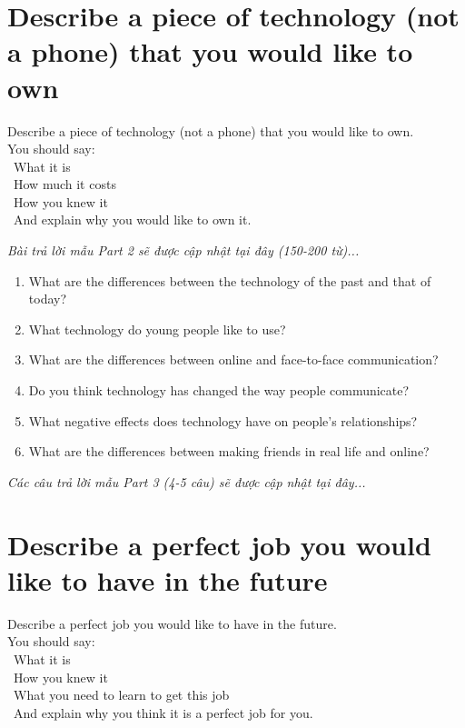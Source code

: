 \section{Describe a piece of technology (not a phone) that you would like to own}
\begin{ieltsprompt}
Describe a piece of technology (not a phone) that you would like to own. \\
You should say: \\
\textbullet\ What it is \\
\textbullet\ How much it costs \\
\textbullet\ How you knew it \\
\textbullet\ And explain why you would like to own it. \\
\end{ieltsprompt}

\vspace{1em}
\textit{Bài trả lời mẫu Part 2 sẽ được cập nhật tại đây (150-200 từ)...}
\vspace{2em}

\begin{ieltsprompt}
\begin{enumerate}[itemsep=4pt]
    \item What are the differences between the technology of the past and that of today?
    \item What technology do young people like to use?
    \item What are the differences between online and face-to-face communication?
    \item Do you think technology has changed the way people communicate?
    \item What negative effects does technology have on people's relationships?
    \item What are the differences between making friends in real life and online?
\end{enumerate}
\end{ieltsprompt}

\vspace{1em}
\textit{Các câu trả lời mẫu Part 3 (4-5 câu) sẽ được cập nhật tại đây...}
\vspace{2em}

\section{Describe a perfect job you would like to have in the future}
\begin{ieltsprompt}
Describe a perfect job you would like to have in the future. \\
You should say: \\
\textbullet\ What it is \\
\textbullet\ How you knew it \\
\textbullet\ What you need to learn to get this job \\
\textbullet\ And explain why you think it is a perfect job for you. \\
\end{ieltsprompt}

